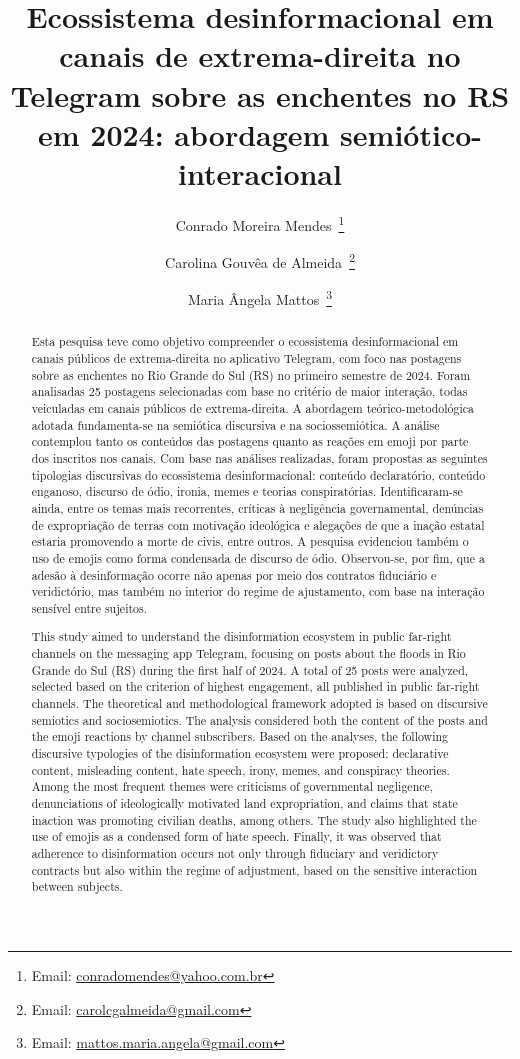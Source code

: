 \documentclass[portuguese]{textolivre}
\title{Ecossistema desinformacional em canais de extrema-direita no Telegram sobre as enchentes no RS em 2024: abordagem semiótico-interacional}
\author[1]{Conrado Moreira Mendes~\orcid{0000-0002-3721-8578}\thanks{Email: \href{mailto:conradomendes@yahoo.com.br}{conradomendes@yahoo.com.br}}}
\author[1]{Carolina Gouvêa de Almeida~\orcid{0009-0009-5442-9850}\thanks{Email: \href{mailto:carolcgalmeida@gmail.com}{carolcgalmeida@gmail.com}}}
\author[1]{Maria Ângela Mattos~\orcid{0000-0002-0764-6846}\thanks{Email: \href{mailto:mattos.maria.angela@gmail.com}{mattos.maria.angela@gmail.com}}}
\affil[1]{Pontifícia Universidade Católica de Minas Gerais, Belo Horizonte, MG, Brasil.}
\begin{document}
\maketitle

\begin{polyabstract}
\begin{abstract}
Esta pesquisa teve como objetivo compreender o ecossistema desinformacional em canais públicos de extrema-direita no aplicativo Telegram, com foco nas postagens sobre as enchentes no Rio Grande do Sul (RS) no primeiro semestre de 2024. Foram analisadas 25 postagens selecionadas com base no critério de maior interação, todas veiculadas em canais públicos de extrema-direita. A abordagem teórico-metodológica adotada fundamenta-se na semiótica discursiva e na sociossemiótica. A análise contemplou tanto os conteúdos das postagens quanto as reações em emoji por parte dos inscritos nos canais. Com base nas análises realizadas, foram propostas as seguintes tipologias discursivas do ecossistema desinformacional: conteúdo declaratório, conteúdo enganoso, discurso de ódio, ironia, memes e teorias conspiratórias. Identificaram-se ainda, entre os temas mais recorrentes, críticas à negligência governamental, denúncias de expropriação de terras com motivação ideológica e alegações de que a inação estatal estaria promovendo a morte de civis, entre outros. A pesquisa evidenciou também o uso de emojis como forma condensada de discurso de ódio. Observou-se, por fim, que a adesão à desinformação ocorre não apenas por meio dos contratos fiduciário e veridictório, mas também no interior do regime de ajustamento, com base na interação sensível entre sujeitos.

\end{abstract}

\begin{english}
\begin{abstract}
 This study aimed to understand the disinformation ecosystem in public far-right channels on the messaging app Telegram, focusing on posts about the floods in Rio Grande do Sul (RS) during the first half of 2024. A total of 25 posts were analyzed, selected based on the criterion of highest engagement, all published in public far-right channels. The theoretical and methodological framework adopted is based on discursive semiotics and sociosemiotics. The analysis considered both the content of the posts and the emoji reactions by channel subscribers. Based on the analyses, the following discursive typologies of the disinformation ecosystem were proposed: declarative content, misleading content, hate speech, irony, memes, and conspiracy theories. Among the most frequent themes were criticisms of governmental negligence, denunciations of ideologically motivated land expropriation, and claims that state inaction was promoting civilian deaths, among others. The study also highlighted the use of emojis as a condensed form of hate speech. Finally, it was observed that adherence to disinformation occurs not only through fiduciary and veridictory contracts but also within the regime of adjustment, based on the sensitive interaction between subjects.


\end{abstract}
\end{english}
\end{polyabstract}
\end{document}
